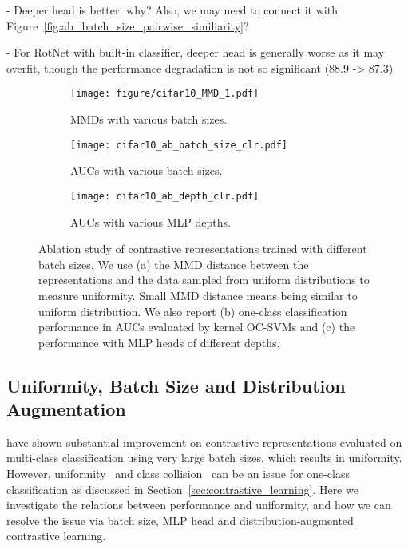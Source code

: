 \documentclass{article} \usepackage{iclr2021_conference,times}
\begin{document}
- Deeper head is better. {\color{red} why? Also, we may need to connect it with Figure~\ref{fig:ab_batch_size_pairwise_similiarity}?}

- For RotNet with built-in classifier, deeper head is generally worse as it may overfit, though the performance degradation is not so significant (88.9 -> 87.3)
\fi

\vspace{-0.1in}
\begin{figure}[t]
    \centering
    \begin{subfigure}{.32\textwidth}
        \centering
        \texttt{[image: figure/cifar10\_MMD\_1.pdf]}
    \caption{MMDs with various batch sizes.}
    \label{fig:ab_batch_size_uniformity}
    \end{subfigure}
    \hspace{0.03in}
    \begin{subfigure}{.32\textwidth}
        \centering
        \texttt{[image: cifar10\_ab\_batch\_size\_clr.pdf]}
    \caption{AUCs with various batch sizes.}
    \label{fig:ab_batch_size_clr}
    \end{subfigure}
    \begin{subfigure}{.32\textwidth}
        \centering
        \texttt{[image: cifar10\_ab\_depth\_clr.pdf]}
    \caption{AUCs with various MLP depths.}
    \label{fig:ab_depth_clr}
    \end{subfigure}
    \vspace{-0.1in}
    \caption{Ablation study of contrastive representations trained with different batch sizes. We use (a) the MMD distance between the representations and the data sampled from uniform distributions to measure uniformity. Small MMD distance means being similar to uniform distribution. We also report (b) one-class classification performance in AUCs evaluated by kernel OC-SVMs and (c) the performance with MLP heads of different depths.}
    \label{fig:ab_batch_size}
    \vspace{-0.15in}
\end{figure}

\vspace{-0.1in}
\subsection{Uniformity, Batch Size and Distribution Augmentation}
\label{sec:ablation_batch_size}
\vspace{-0.05in}
\cite{oord2018representation,henaff2019data,bachman2019learning,chen2020simple} have shown substantial improvement on contrastive representations evaluated on multi-class classification using very large batch sizes, which results in uniformity. However, uniformity~\citep{wang2020understanding} and class collision~\citep{saunshi2019theoretical} can be an issue for one-class classification as discussed in Section~\ref{sec:contrastive_learning}.
Here we investigate the relations between performance and uniformity, and how we can resolve the issue via batch size, MLP head and distribution-augmented contrastive learning.
\end{document}
